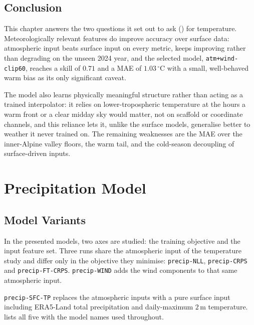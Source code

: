 \subsection{Conclusion}\label{subsec:single-tmax-conclusion}



This chapter answers the two questions it set out to ask () for temperature. Meteorologically relevant features do improve accuracy over surface data: atmospheric input beats surface input on every metric, keeps improving rather than degrading on the unseen 2024 year, and the selected model, \texttt{atm+wind-clip60}, reaches a skill of $0.71$ and a MAE of $1.03\,^{\circ}\mathrm{C}$ with a small, well-behaved warm bias as its only significant caveat.


The model also learns physically meaningful structure rather than acting as a trained interpolator: it relies on lower-tropospheric temperature at the hours a warm front or a clear midday sky would matter, not on scaffold or coordinate channels, and this reliance lets it, unlike the surface models, generalise better to weather it never trained on. The remaining weaknesses are the MAE over the inner-Alpine valley floors, the warm tail, and the cold-season decoupling of surface-driven inputs.



\section{Precipitation Model}\label{sec:single-precipitation}




\subsection{Model Variants}\label{subsec:single-precip-variants}

In the presented models, two axes are studied: the training objective and the input feature set. Three runs share the
atmospheric input of the temperature study and differ only in the objective they minimise:
\texttt{precip-NLL}, \texttt{precip-CRPS} and \texttt{precip-FT-CRPS}. \texttt{precip-WIND} adds the
wind components to that same atmospheric input.

\texttt{precip-SFC-TP} replaces the atmospheric inputs with a pure surface
input including ERA5-Land total precipitation and daily-maximum $2\,\mathrm{m}$ temperature.  lists all five with the model names used throughout.

